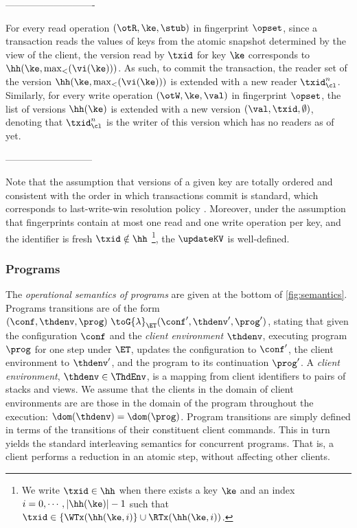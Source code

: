 ----------------------------

For every read operation $(\otR, \ke, \stub)$ in fingerprint $\opset$,
since a transaction reads the values of keys from 
the atomic snapshot determined by the view of the client, 
the version read by $\txid$ for key $\ke$ corresponds to $\hh(\ke, \max_{<}(\vi(\ke)))$.
As such, to commit the transaction, 
the reader set of the version $\hh(\ke, \max_{<}(\vi(\ke)))$ is extended with a new reader $\txid_\cl^n$.
Similarly, for every write operation $(\otW, \ke, \val)$ in fingerprint $\opset$, 
the list of versions $\hh(\ke)$ is extended with a new version $(\val, \txid, \emptyset)$, 
denoting that $\txid_\cl^n$ is the writer of this version which has no readers as of yet. 

---------------------------

Note that the assumption that 
versions of a given key are totally ordered and consistent with the order in which 
transactions commit is standard, 
which corresponds to last-write-win resolution policy \cite{adya,framework-concur,seebelieve}. 
Moreover, under the assumption that fingerprints contain at most one read and one write 
operation per key, and the identifier is fresh $\txid \notin \hh$%
\footnote{%
We write $\txid \in \hh$ when there exists a key 
$\ke$ and an index $i=0,\cdots, \lvert \hh(\ke) \rvert -1$ such that $\txid \in \{\WTx(\hh(\ke, i)\} \cup \RTx(\hh(\ke, i))$.}, 
the $\updateKV$ is well-defined.


\subsubsection{Programs}
The \emph{operational semantics of programs} are given at the bottom of \cref{fig:semantics}. 
Programs transitions are of the form $(\conf,  \thdenv, \prog) \ \toG{\lambda}_{\ET} (\conf',  \thdenv', \prog')$,
stating that given the configuration $\conf$ and the \emph{client environment} $\thdenv$, executing program $\prog$ for one step under $\ET$, updates the configuration to $\conf'$, the client environment to $\thdenv'$, and the program to its continuation $\prog'$. 
A \emph{client environment}, $\thdenv \in \ThdEnv$, is a mapping from client identifiers to pairs of stacks and views. 
We assume that the clients in the domain of client environments are are those in the domain of the program throughout the execution: 
$\dom(\thdenv) = \dom(\prog)$.
Program transitions are simply defined in terms of the transitions of their constituent client commands.
This in turn yields the standard interleaving semantics for concurrent programs. 
That is, a client performs a reduction in an atomic step, without affecting other clients.


